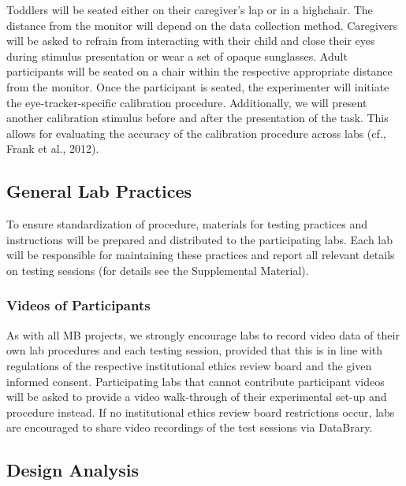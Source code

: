 \documentclass[
  english,
  man,floatsintext]{apa6}
\begin{document}
Toddlers will be seated either on their caregiver's lap or in a highchair. The distance from the monitor will depend on the data collection method. Caregivers will be asked to refrain from interacting with their child and close their eyes during stimulus presentation or wear a set of opaque sunglasses. Adult participants will be seated on a chair within the respective appropriate distance from the monitor. Once the participant is seated, the experimenter will initiate the eye-tracker-specific calibration procedure. Additionally, we will present another calibration stimulus before and after the presentation of the task. This allows for evaluating the accuracy of the calibration procedure across labs (cf., Frank et al., 2012).

\hypertarget{general-lab-practices}{%
\subsection{General Lab Practices}\label{general-lab-practices}}

To ensure standardization of procedure, materials for testing practices and instructions will be prepared and distributed to the participating labs. Each lab will be responsible for maintaining these practices and report all relevant details on testing sessions (for details see the Supplemental Material).

\hypertarget{videos-of-participants}{%
\subsubsection{Videos of Participants}\label{videos-of-participants}}

As with all MB projects, we strongly encourage labs to record video data of their own lab procedures and each testing session, provided that this is in line with regulations of the respective institutional ethics review board and the given informed consent. Participating labs that cannot contribute participant videos will be asked to provide a video walk-through of their experimental set-up and procedure instead. If no institutional ethics review board restrictions occur, labs are encouraged to share video recordings of the test sessions via DataBrary.

\hypertarget{design-analysis}{%
\subsection{Design Analysis}\label{design-analysis}}
\end{document}
